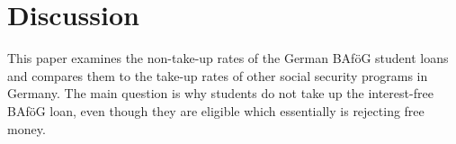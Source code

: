 \section{Discussion}
%
%
This paper examines the non-take-up rates of the German BAföG student loans and compares them to the take-up rates of other social security programs in Germany.
The main question is why students do not take up the interest-free BAföG loan, even though they are eligible which essentially is rejecting free money. 


%
%

%
%

%
%

%
%

%
%

%
%
